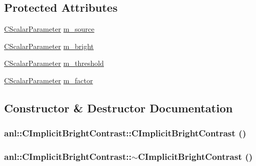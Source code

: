 \subsection*{Protected Attributes}
\begin{DoxyCompactItemize}
\item 
\hyperlink{classanl_1_1CScalarParameter}{CScalarParameter} \hyperlink{classanl_1_1CImplicitBrightContrast_a30f07efced6f3942452432f53b313e08}{m\_\-source}
\item 
\hyperlink{classanl_1_1CScalarParameter}{CScalarParameter} \hyperlink{classanl_1_1CImplicitBrightContrast_a1e83dc99d48e90650869dc73b5818f3b}{m\_\-bright}
\item 
\hyperlink{classanl_1_1CScalarParameter}{CScalarParameter} \hyperlink{classanl_1_1CImplicitBrightContrast_ae3c48f4d38fad67e75d5867b245cbd39}{m\_\-threshold}
\item 
\hyperlink{classanl_1_1CScalarParameter}{CScalarParameter} \hyperlink{classanl_1_1CImplicitBrightContrast_ae049a20de4e20ecf4b2fc81007754e58}{m\_\-factor}
\end{DoxyCompactItemize}


\subsection{Constructor \& Destructor Documentation}
\hypertarget{classanl_1_1CImplicitBrightContrast_abc96d388571ee3f9cd77aeb5a9988661}{
\subsubsection[{CImplicitBrightContrast}]{\setlength{\rightskip}{0pt plus 5cm}anl::CImplicitBrightContrast::CImplicitBrightContrast ()}}
\label{classanl_1_1CImplicitBrightContrast_abc96d388571ee3f9cd77aeb5a9988661}
\hypertarget{classanl_1_1CImplicitBrightContrast_aaa74e84e46905bb5eb1c9c4449c80a95}{
\subsubsection[{$\sim$CImplicitBrightContrast}]{\setlength{\rightskip}{0pt plus 5cm}anl::CImplicitBrightContrast::$\sim$CImplicitBrightContrast ()}}
\label{classanl_1_1CImplicitBrightContrast_aaa74e84e46905bb5eb1c9c4449c80a95}



